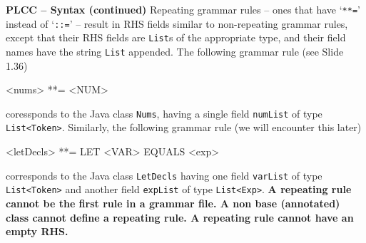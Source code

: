 \begin{minipage}[t]{\sw}
\slidenumber
\LARGE
{\bf PLCC -- Syntax (continued)}\exx
Repeating grammar rules --
ones that have `\verb'**='' instead of `\verb'::='' --
result in RHS fields similar
to non-repeating grammar rules,
except that their RHS fields are \verb'List's of the appropriate type,
and their field names have the string \verb'List' appended.\exx
The following grammar rule (see Slide 1.36)
{\Large
\begin{qv}
<nums> **= <NUM>
\end{qv}
}
coressponds to the Java class \verb'Nums',
having a single field \verb'numList' of type \verb'List<Token>'.\exx
Similarly, the following grammar rule (we will encounter this later)
{\Large
\begin{qv}
<letDecls> **= LET <VAR> EQUALS <exp>
\end{qv}
}
corresponds to the Java class \verb'LetDecls'
having one field \verb'varList' of type \verb'List<Token>'
and another field \verb'expList' of type \verb'List<Exp>'.\exx
{\bf A repeating rule cannot be the first rule in a grammar file.
A non base (annotated) class cannot define a repeating rule.
A repeating rule cannot have an empty RHS.}
\end{minipage}
\clearpage
